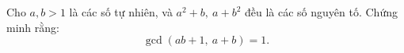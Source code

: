 \ifshowproblem
\begin{problem}\label{example:RUS-2015-SMO-11-P2}
    Cho \( a, b > 1 \) là các số tự nhiên, và \( a^2 + b,\ a + b^2 \) đều là các số nguyên tố.  
    Chứng minh rằng:
    \[
        \gcd(ab + 1,\ a + b) = 1.
    \]
\end{problem}
\fi

\footnotemark
{}
\fi